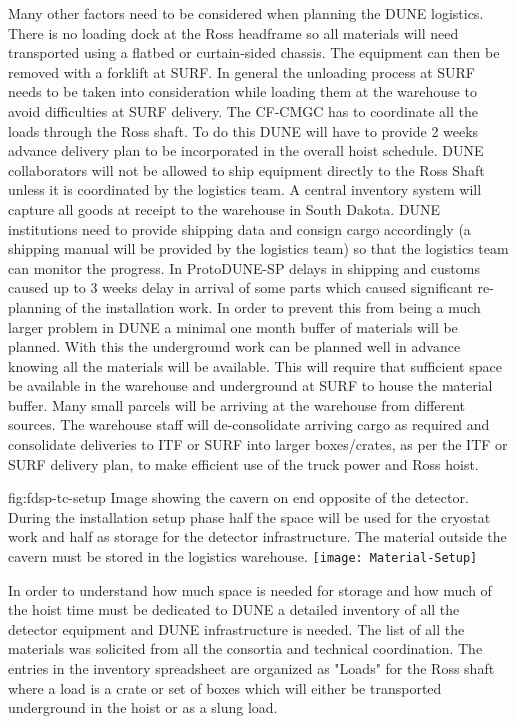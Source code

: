 Many other factors need to be considered when planning the DUNE logistics. There is no loading dock at the Ross headframe so all materials will need transported using a flatbed or curtain-sided chassis. The equipment can then be removed with a forklift at SURF. In general the unloading process at SURF needs to be taken into consideration while loading them at the warehouse to avoid difficulties at SURF delivery. The CF-CMGC has to coordinate all the loads through the Ross shaft. To do this DUNE will have to provide 2 weeks advance delivery plan to be incorporated in the overall hoist schedule. DUNE collaborators will not be allowed to ship equipment directly to the Ross Shaft unless it is coordinated by the logistics team. A central inventory system will capture all goods at receipt to the warehouse in South Dakota. DUNE institutions need to provide shipping data and consign cargo accordingly (a shipping manual will be provided by the logistics team) so that the logistics team can monitor the progress. In ProtoDUNE-SP delays in shipping and customs caused up to 3 weeks delay in arrival of some parts which caused significant re-planning of the installation work. In order to prevent this from being a much larger problem in DUNE a minimal one month buffer of materials will be planned. With this the underground work can be planned well in advance knowing all the materials will be available. This will require that sufficient space be available in the warehouse and underground at SURF to house the material buffer. Many small parcels will be arriving at the warehouse from different sources. The warehouse staff will de-consolidate arriving cargo as required and consolidate deliveries to ITF or SURF into larger boxes/crates, as per the ITF or SURF delivery plan, to make efficient use of the truck power and Ross hoist. 


\begin{dunefigure}{fig:fdsp-tc-setup}
  {Image showing the cavern on end opposite of the detector. During the installation setup phase half the space will be used for the cryostat work and half as storage for the detector infrastructure. The material outside the cavern must be stored in the logistics warehouse.}
\texttt{[image: Material-Setup]}
\end{dunefigure}
%

In order to understand how much space is needed for storage and how much of the hoist time must be dedicated to DUNE a detailed inventory of all the detector equipment and DUNE infrastructure is needed. The list of all the materials was solicited from all the consortia and technical coordination. The entries in the inventory spreadsheet are organized as "Loads" for the Ross shaft where a load is a crate or set of boxes which will either be transported underground in the hoist or as a slung load.\cite{bib:docdb8426}

